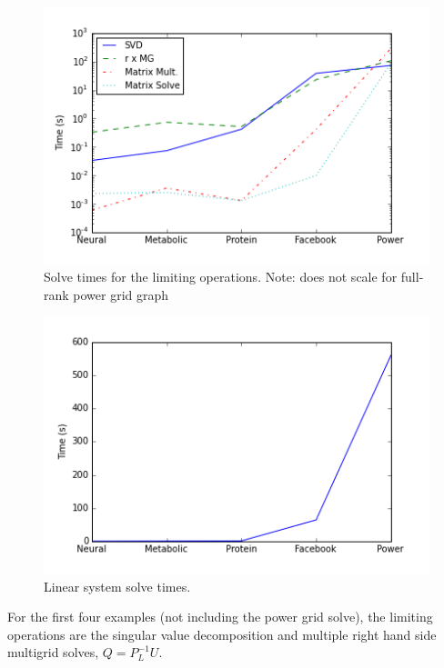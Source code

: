 \documentclass{article}
\begin{document}
\begin{figure}[H]
\centering
\includegraphics[width = \linewidth]{operationtimes.png}
\caption{Solve times for the limiting operations. Note: does not scale for full-rank power grid graph}
\end{figure}

\begin{figure}[H]
\centering
\includegraphics[width = \linewidth]{stimes.png}
\caption{Linear system solve times.}
\end{figure}

For the first four examples (not including the power grid solve), the limiting operations are the singular value decomposition and multiple right hand side multigrid solves, $Q = P_L^{-1}U$. 
\end{document}

